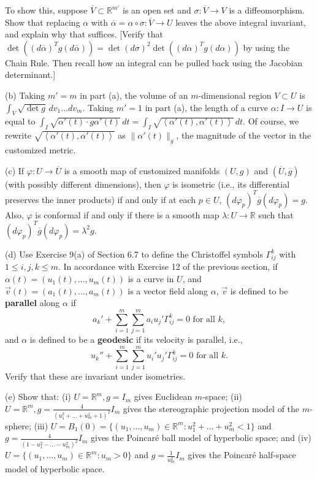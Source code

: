 \documentclass[leqno]{book}
\begin{document}
\begin{enumerate}
To show this, suppose $\overline V\subset\mathbb R^{m'}$ is an open set and $\sigma:\overline V\to V$ is a diffeomorphism.  Show that replacing $\alpha$ with $\overline\alpha=\alpha\circ\sigma:\overline V\to U$ leaves the above integral invariant, and explain why that suffices.  [Verify that $\det((d\overline\alpha)^Tg(d\overline\alpha))=\det(d\sigma)^2\det((d\alpha)^Tg(d\alpha))$ by using the Chain Rule.  Then recall how an integral can be pulled back using the Jacobian determinant.]

(b) Taking $m'=m$ in part (a), the volume of an $m$-dimensional region $V\subset U$ is $\int_V\sqrt{\det g}\,dv_1\dots dv_m$.  Taking $m'=1$ in part (a), the length of a curve $\alpha:I\to U$ is equal to $\int_I\sqrt{\alpha'(t)\cdot g\alpha'(t)}\,dt=\int_I\sqrt{\left<\alpha'(t),\alpha'(t)\right>}\,dt$.  Of course, we rewrite $\sqrt{\left<\alpha'(t),\alpha'(t)\right>}$ as $\|\alpha'(t)\|_g$, the magnitude of the vector in the customized metric.

(c) If $\varphi:U\to\overline U$ is a smooth map of customized manifolds $(U,g)$ and $(\overline U,\overline g)$ (with possibly different dimensions), then $\varphi$ is isometric (i.e., its differential preserves the inner products) if and only if at each $p\in U$, $(d\varphi_p)^T\overline g(d\varphi_p)=g$.  Also, $\varphi$ is conformal if and only if there is a smooth map $\lambda:U\to\mathbb R$ such that $(d\varphi_p)^T\overline g(d\varphi_p)=\lambda^2g$.

(d) Use Exercise 9(a) of Section 6.7 to define the Christoffel symbols $\Gamma_{ij}^k$ with $1\leqslant i,j,k\leqslant m$.  In accordance with Exercise 12 of the previous section, if $\alpha(t)=(u_1(t),\dots,u_m(t))$ is a curve in $U$, and $\vec v(t)=(a_1(t),\dots,a_m(t))$ is a vector field along $\alpha$, $\vec v$ is defined to be \textbf{parallel} along $\alpha$ if
$$a_k'+\sum_{i=1}^m\sum_{j=1}^ma_iu_j'\Gamma_{ij}^k=0\text{ for all }k,$$
and $\alpha$ is defined to be a \textbf{geodesic} if its velocity is parallel, i.e.,
$$u_k''+\sum_{i=1}^m\sum_{j=1}^mu_i'u_j'\Gamma_{ij}^k=0\text{ for all }k.$$
Verify that these are invariant under isometries.

(e) Show that: (i) $U=\mathbb R^m,g=I_m$ gives Euclidean $m$-space; (ii) $U=\mathbb R^m,g=\frac 4{(u_1^2+\dots+u_m^2+1)^2}I_m$ gives the stereographic projection model of the $m$-sphere; (iii) $U=B_1(0)=\{(u_1,\dots,u_m)\in\mathbb R^m:u_1^2+\dots+u_m^2<1\}$ and $g=\frac 4{(1-u_1^2-\dots-u_m^2)^2}I_m$ gives the Poincar\'e ball model of hyperbolic space; and (iv) $U=\{(u_1,\dots,u_m)\in\mathbb R^m:u_m>0\}$ and $g=\frac 1{u_m^2}I_m$ gives the Poincar\'e half-space model of hyperbolic space.


\end{enumerate}
\end{document}
